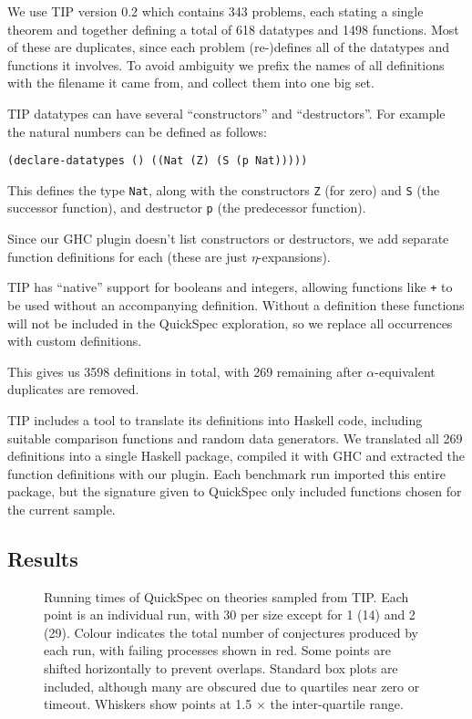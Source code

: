 We use TIP version 0.2 which contains 343 problems, each stating a single
theorem and together defining a total of 618 datatypes and 1498 functions. Most
of these are duplicates, since each problem (re-)defines all of the datatypes
and functions it involves. To avoid ambiguity we prefix the names of all
definitions with the filename it came from, and collect them into one big set.

TIP datatypes can have several ``constructors'' and ``destructors''. For example
the natural numbers can be defined as follows:

\begin{verbatim}
(declare-datatypes () ((Nat (Z) (S (p Nat)))))
\end{verbatim}

This defines the type \texttt{Nat}, along with the constructors \texttt{Z} (for
zero) and \texttt{S} (the successor function), and destructor \texttt{p} (the
predecessor function).

Since our GHC plugin doesn't list constructors or destructors, we add separate
function definitions for each (these are just $\eta$-expansions).

TIP has ``native'' support for booleans and integers, allowing functions like
\texttt{+} to be used without an accompanying definition. Without a definition
these functions will not be included in the QuickSpec exploration, so we replace
all occurrences with custom definitions.

This gives us 3598 definitions in total, with 269 remaining after
$\alpha$-equivalent duplicates are removed.

TIP includes a tool to translate its definitions into Haskell code, including
suitable comparison functions and random data generators. We translated all 269
definitions into a single Haskell package, compiled it with GHC and extracted
the function definitions with our plugin. Each benchmark run imported this
entire package, but the signature given to QuickSpec only included functions
chosen for the current sample.

\subsection{Results}

\begin{figure}
  \centering
  
  \caption{Running times of QuickSpec on theories sampled from TIP. Each point
    is an individual run, with 30 per size except for 1 (14) and 2 (29). Colour
    indicates the total number of conjectures produced by each run, with failing
    processes shown in red. Some points are shifted horizontally to prevent
    overlaps. Standard box plots are included, although many are obscured due to
    quartiles near zero or timeout. Whiskers show points at 1.5 $\times$ the
    inter-quartile range.}
  \label{figure:quickspec_runtimes}
\end{figure}

